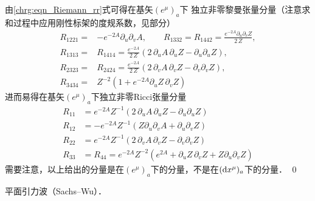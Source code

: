 \noindent {}
由\eqref{chrg:eqn_Riemann_rr}式可得在基矢$(e^\mu)_a$下
独立非零黎曼张量分量（注意求和过程中应用刚性标架的度规系数，见部分）
\begin{equation}
\begin{aligned}
  R_{1221} =& -e^{-2 A} \partial_u\partial_v A, \qquad
  R_{1332} = R_{1442} = \frac{e^{-2A} \partial_u \partial_v Z }{{2}\, Z}, \\
  R_{1313} =& R_{1414}= \frac{e^{-2A}}{{2}\, Z} (2\, \partial_u A \,
    \partial_u Z  - \partial_u \partial_u Z ),  \\
  R_{2323} =& R_{2424} = \frac{e^{-2A}}{{2}\, Z}
    (2\, \partial_v A \, \partial_v Z - \partial_v \partial_v Z ),  \\
  R_{3434} =& Z^{-2} (1+ e^{-2A} \partial_u Z \,\partial_v Z )
\end{aligned}
\end{equation}
进而易得在基矢$(e^\mu)_a$下独立非零Ricci张量分量
\begin{equation}
\begin{aligned}
  R_{11} &= e^{-2A} Z^{-1} ( 2\,\partial_u A \,\partial_u Z - \partial_u \partial_u Z)  \\
  R_{12} &=-e^{-2A} Z^{-1} ( Z\partial_u\partial_v A + \partial_u \partial_v Z )  \\
  R_{22} &= e^{-2A} Z^{-1} ( 2\,\partial_v A \,\partial_v Z - \partial_v \partial_v Z)  \\
  R_{33} &= R_{44}=e^{-2A}Z^{-2}(e^{2A}+\partial_u Z \,\partial_v Z + Z\partial_u \partial_v Z)
\end{aligned}
\end{equation}
需要注意，以上给出的分量是在$(e^\mu)_a$下的分量，不是在$({\rm d}x^\mu)_a$下的分量．
\qed

\begin{example}\label{chrg:exm_SWPlane}
	平面引力波（Sachs--Wu）．
\end{example}

